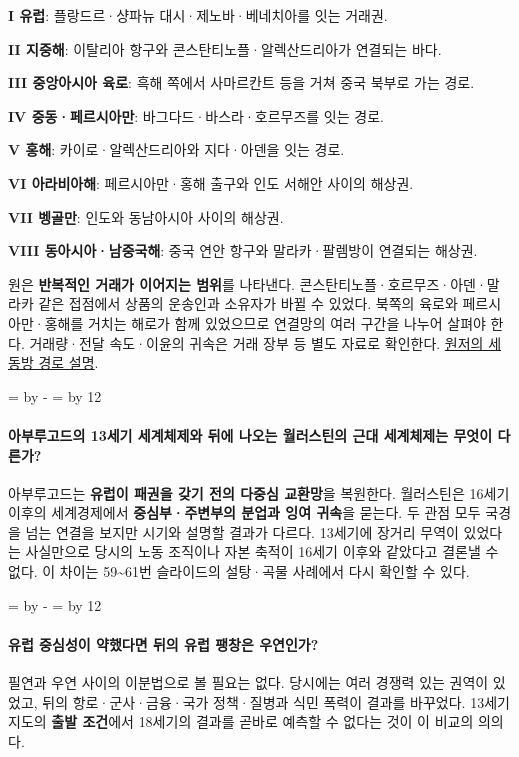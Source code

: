 \documentclass[10pt,a4paper]{article}
\newcommand{\ReserveQuestionSpace}{%
  \par\begingroup
  \dimen0=\pagegoal \advance\dimen0 by -\pagetotal
  \dimen2=\baselineskip \multiply\dimen2 by 12
  \ifdim\dimen0<\dimen2 \newpage\fi
  \endgroup}
\begin{document}
\noindent\textbullet \textbf{I 유럽}: 플랑드르·샹파뉴 대시·제노바·베네치아를 잇는 거래권.\par
\noindent\textbullet \textbf{II 지중해}: 이탈리아 항구와 콘스탄티노플·알렉산드리아가 연결되는 바다.\par
\noindent\textbullet \textbf{III 중앙아시아 육로}: 흑해 쪽에서 사마르칸트 등을 거쳐 중국 북부로 가는 경로.\par
\noindent\textbullet \textbf{IV 중동·페르시아만}: 바그다드·바스라·호르무즈를 잇는 경로.\par
\noindent\textbullet \textbf{V 홍해}: 카이로·알렉산드리아와 지다·아덴을 잇는 경로.\par
\noindent\textbullet \textbf{VI 아라비아해}: 페르시아만·홍해 출구와 인도 서해안 사이의 해상권.\par
\noindent\textbullet \textbf{VII 벵골만}: 인도와 동남아시아 사이의 해상권.\par
\noindent\textbullet \textbf{VIII 동아시아·남중국해}: 중국 연안 항구와 말라카·팔렘방이 연결되는 해상권.\par

원은 \textbf{반복적인 거래가 이어지는 범위}를 나타낸다. 콘스탄티노플·호르무즈·아덴·말라카 같은 접점에서 상품의 운송인과 소유자가 바뀔 수 있었다. 북쪽의 육로와 페르시아만·홍해를 거치는 해로가 함께 있었으므로 연결망의 여러 구간을 나누어 살펴야 한다. 거래량·전달 속도·이윤의 귀속은 거래 장부 등 별도 자료로 확인한다. \href{https://academic.oup.com/book/54378/chapter/422517598}{원저의 세 동방 경로 설명}.\par

\ReserveQuestionSpace
\paragraph{아부루고드의 13세기 세계체제와 뒤에 나오는 월러스틴의 근대 세계체제는 무엇이 다른가?}
아부루고드는 \textbf{유럽이 패권을 갖기 전의 다중심 교환망}을 복원한다. 월러스틴은 16세기 이후의 세계경제에서 \textbf{중심부·주변부의 분업과 잉여 귀속}을 묻는다. 두 관점 모두 국경을 넘는 연결을 보지만 시기와 설명할 결과가 다르다. 13세기에 장거리 무역이 있었다는 사실만으로 당시의 노동 조직이나 자본 축적이 16세기 이후와 같았다고 결론낼 수 없다. 이 차이는 59\textasciitilde{}61번 슬라이드의 설탕·곡물 사례에서 다시 확인할 수 있다.\par

\ReserveQuestionSpace
\paragraph{유럽 중심성이 약했다면 뒤의 유럽 팽창은 우연인가?}
필연과 우연 사이의 이분법으로 볼 필요는 없다. 당시에는 여러 경쟁력 있는 권역이 있었고, 뒤의 항로·군사·금융·국가 정책·질병과 식민 폭력이 결과를 바꾸었다. 13세기 지도의 \textbf{출발 조건}에서 18세기의 결과를 곧바로 예측할 수 없다는 것이 이 비교의 의의다.\par
\end{document}
